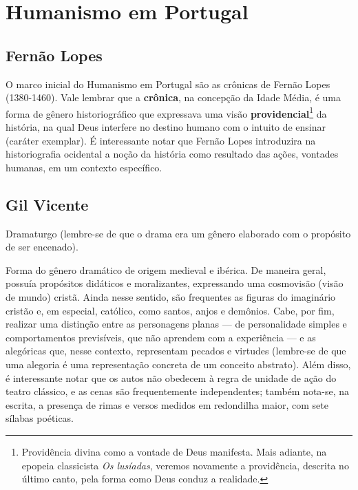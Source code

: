 
\chapter{Humanismo em Portugal}

\section{Fernão Lopes}

O marco inicial do Humanismo em Portugal são as crônicas de Fernão Lopes (1380-1460). Vale lembrar que a \textbf{crônica}, na concepção da Idade Média, é uma forma de gênero historiográfico que expressava uma visão \textbf{providencial}\footnote{Providência divina como a vontade de Deus manifesta. Mais adiante, na epopeia classicista \textit{Os lusíadas}, veremos novamente a providência, descrita no último canto, pela forma como Deus conduz a realidade.} da história, na qual Deus interfere no destino humano com o intuito de ensinar (caráter exemplar). É interessante notar que Fernão Lopes introduzira na historiografia ocidental a noção da história como resultado das ações, vontades humanas, em um contexto específico.

\section{Gil Vicente}

Dramaturgo (lembre-se de que o drama era um gênero elaborado com o propósito de ser encenado).

\begin{definition}[Auto]
Forma do gênero dramático de origem medieval e ibérica. De maneira geral, possuía propósitos didáticos e moralizantes, expressando uma cosmovisão (visão de mundo) cristã. Ainda nesse sentido, são frequentes as figuras do imaginário cristão e, em especial, católico, como santos, anjos e demônios. Cabe, por fim, realizar uma distinção entre as personagens planas — de personalidade simples e comportamentos previsíveis, que não aprendem com a experiência — e as alegóricas que, nesse contexto, representam pecados e virtudes (lembre-se de que uma alegoria é uma representação concreta de um conceito abstrato). Além disso, é interessante notar que os autos não obedecem à regra de unidade de ação do teatro clássico, e as cenas são frequentemente independentes; também nota-se, na escrita, a presença de rimas e versos medidos em redondilha maior, com sete sílabas poéticas.
\end{definition}


